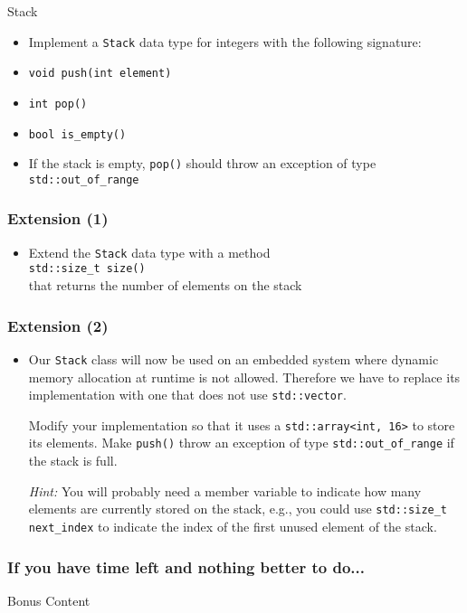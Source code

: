 \documentclass[10pt,aspectratio=169]{beamer}
\begin{document}
\begin{frame}[fragile]{Stack}
\begin{itemize}
\item Implement a \texttt{Stack} data type for integers with the
  following signature:
\item \texttt{void push(int element)}
\item \texttt{int pop()}
\item \verb!bool is_empty()!
\item If the stack is empty, \texttt{pop()} should throw an exception
  of type \verb!std::out_of_range!
\end{itemize}
\end{frame}

\begin{frame}[fragile]
  \frametitle{Extension (1)}  
  \begin{itemize}
  \item Extend the \texttt{Stack} data type with a method\\[1ex]
    \verb!std::size_t size()!\\[1ex]
    that returns the number of elements on the stack
  \end{itemize}
\end{frame}

\begin{frame}[fragile]
  \frametitle{Extension (2)}
  \begin{itemize}
  \item Our \texttt{Stack} class will now be used on an embedded
    system where dynamic memory allocation at runtime is not allowed.
    Therefore we have to replace its implementation with one that does
    not use \verb!std::vector!.

    Modify your implementation so that it uses a
    \verb|std::array<int, 16>| to store its elements. Make
    \texttt{push()} throw an exception of type
    \verb!std::out_of_range! if the stack is full.

    \bigskip
    \emph{Hint:} You will probably need a member variable to indicate
    how many elements are currently stored on the stack, e.g., you could use
    \verb!std::size_t next_index! to indicate the index of the first
    unused element of the stack.
  \end{itemize}
\end{frame}

\begin{frame}[fragile]
	\frametitle{If you have time left and nothing better to do...}
	\begin{center}
		\LARGE Bonus Content
	\end{center}
\end{frame}
\end{document}
